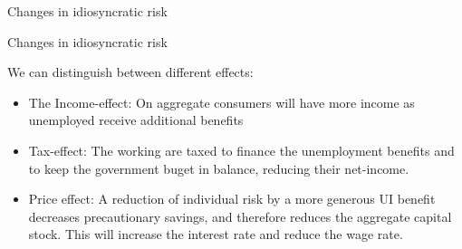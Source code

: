 \documentclass{beamer}
\begin{document}
\begin{frame}{Changes in idiosyncratic risk}




\end{frame}




\begin{frame}{Changes in idiosyncratic risk}

	
We can distinguish between different effects: 

	\begin{itemize}
	\item {
The Income-effect: On aggregate consumers will have more income as unemployed receive additional benefits

	}	
	\item {
Tax-effect: The working are taxed to finance the unemployment benefits and to keep the government buget in balance, reducing their net-income. 

	}	
	\item {
Price effect: A reduction of individual risk by a more generous UI benefit decreases precautionary savings, and therefore reduces the aggregate capital stock. This will increase the interest rate and reduce the wage rate.
	}	

	\end{itemize} 
\end{frame}
\end{document}
